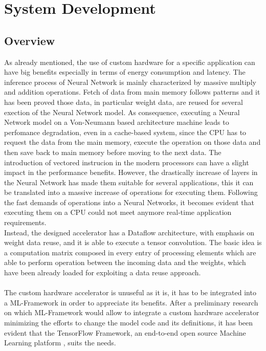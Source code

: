 \chapter{System Development}

\section{Overview}
As already mentioned, the use of custom hardware for a specific application can have big benefits especially in terms of energy consumption and latency.
The inference process of Neural Network is mainly characterized by massive multiply and addition operations. Fetch of data from main memory follows patterns and it has been proved those data, in particular weight data, are reused for several exection of the Neural Network model.
As consequence, executing a Neural Network model on a Von-Neumann based architecture machine leads to perfomance degradation, even in a cache-based system, since the CPU has to request the data from the main memory, execute the operation on those data and then save back to main memory before moving to the next data. The introduction of vectored instrucion in the modern processors can have a slight impact in the performance benefits. However, the drastically increase of layers in the Neural Network has made them suitable for several applications, this it can be translated into a massive increase of operations for executing them. Following the fast demands of operations into a Neural Networks, it becomes evident that executing them on a CPU could not meet anymore real-time application requirements.\\
Instead,  the designed accelerator has a Dataflow architecture, with emphasis on weight data reuse, and it is able to execute a tensor convolution. The basic idea is a computation matrix composed in every entry of processing elements which are able to perform operation between the incoming data and the weights, which have been already loaded for exploiting a data reuse approach.\\\\
The custom hardware accelerator is unuseful as it is, it has to be integrated into a ML-Framework in order to appreciate its benefits. After a preliminary research on which ML-Framework would allow to integrate a custom hardware accelerator minimizing the efforts to change the model code and its definitions, it has been evident that the TensorFlow Framework, an end-to-end open source Machine Learning platform \cite{WEBSITE:4}, suits the needs.\\
